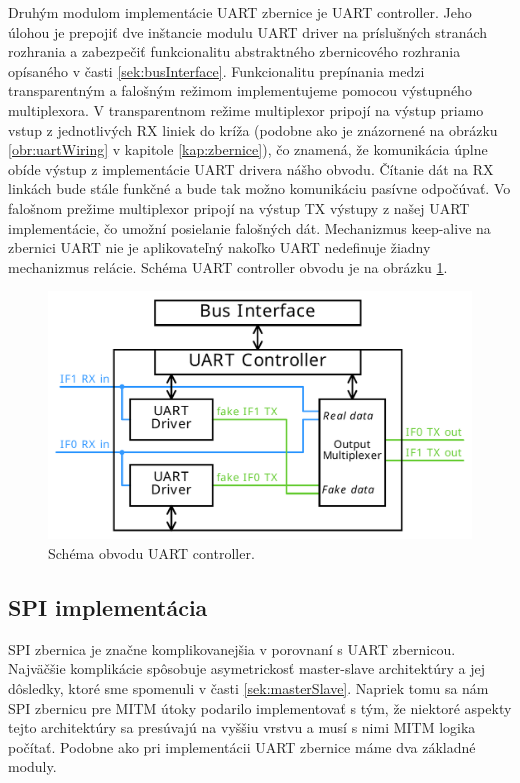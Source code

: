 Druhým modulom implementácie UART zbernice je UART controller. Jeho úlohou je prepojiť dve inštancie modulu UART driver na príslušných stranách rozhrania a zabezpečiť funkcionalitu abstraktného zbernicového rozhrania opísaného v časti \ref{sek:busInterface}. Funkcionalitu prepínania medzi transparentným a falošným režimom implementujeme pomocou výstupného multiplexora. V transparentnom režime multiplexor pripojí na výstup priamo vstup z jednotlivých RX liniek do kríža (podobne ako je znázornené na obrázku \ref{obr:uartWiring} v kapitole \ref{kap:zbernice}), čo znamená, že komunikácia úplne obíde výstup z implementácie UART drivera nášho obvodu. Čítanie dát na RX linkách bude stále funkčné a bude tak možno komunikáciu pasívne odpočúvať. Vo falošnom prežime multiplexor pripojí na výstup TX výstupy z našej UART implementácie, čo umožní posielanie falošných dát. Mechanizmus keep-alive na zbernici UART nie je aplikovateľný nakoľko UART nedefinuje žiadny mechanizmus relácie. Schéma UART controller obvodu je na obrázku \ref{obr:uartController}.

\begin{figure}
    \centerline{\includegraphics[width=1\textwidth]{images/designs/uartController.pdf}}
    \caption[Schéma obvodu UART controller]{Schéma obvodu UART controller.}
    \label{obr:uartController}
\end{figure}

\subsection{SPI implementácia}
SPI zbernica je značne komplikovanejšia v porovnaní s UART zbernicou. Najväčšie komplikácie spôsobuje asymetrickosť master-slave architektúry a jej dôsledky, ktoré sme spomenuli v časti \ref{sek:masterSlave}. Napriek tomu sa nám SPI zbernicu pre MITM útoky podarilo implementovať s tým, že niektoré aspekty tejto architektúry sa presúvajú na vyššiu vrstvu a musí s nimi MITM logika počítať. Podobne ako pri implementácii UART zbernice máme dva základné moduly.

